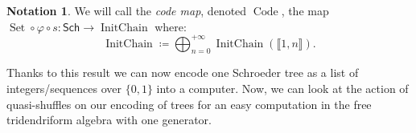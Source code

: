 \documentclass[a4paper,10pt]{amsart}
\DeclareMathOperator{\ima}{Im}
\DeclareMathOperator{\IC}{InitChain}
\DeclareMathOperator{\Code}{Code}
\DeclareMathOperator{\Set}{Set}
\DeclareMathOperator{\Con}{Con}
\newcommand\Sch{\mathsf{Sch}}
\newcommand\NN{\mathbb{N}}
\newcommand{\IEM}[2]{\llbracket #1,#2 \rrbracket}
\newcommand{\Schw}{Schroeder} %
\newtheorem{prop}{Proposition}
\theoremstyle{definition}
\newtheorem{defi}{Definition}
\newtheorem{Not}{Notation}
\newtheorem{Rq}{Remark}
\newcommand{\PCt}[1]{{\color{blue} \texttt{#1}}}
\begin{document}
\begin{Not}
	We will call the \emph{code map}, denoted $\Code$, the map $\Set\circ\varphi\circ s:\Sch\to \IC$ where:
	\[
	\IC \coloneqq \bigoplus_{n=0}^{+\infty} \IC(\IEM{1}{n}).
	\]
\end{Not}
Thanks to this result we can now encode one \Schw{} tree as a list of integers/sequences over $\{0,1\}$ into a computer. Now, we can look at the action of quasi-shuffles on our encoding of trees for an easy computation in the free tridendriform algebra with one generator.

%
%
% 
\end{document}
